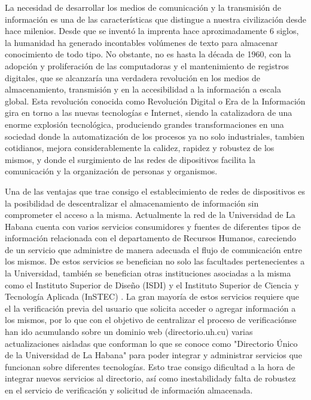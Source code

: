 \begin{introduction}
        La necesidad de desarrollar los medios de comunicación y la transmisión de información 
    es una de las características que distingue a nuestra civilización desde hace milenios. Desde 
    que se inventó la imprenta hace aproximadamente 6 siglos, la humanidad ha generado incontables 
    volúmenes de texto para almacenar conocimiento de todo tipo. No obstante, no es hasta la 
    década de 1960, con la adopción y proliferación de las computadoras y el mantenimiento de registros 
    digitales, que se alcanzaría una verdadera revolución en los medios de almacenamiento, transmisión 
    y en la accesibilidad a la información a escala global. Esta revolución conocida como Revolución 
    Digital o Era de la Información gira en torno a las nuevas tecnologías e Internet, siendo la 
    catalizadora de una enorme explosión tecnológica, produciendo grandes transformaciones en una 
    sociedad donde la automatización de los procesos ya no solo industriales, tambien cotidianos, 
    mejora considerablemente la calidez, rapidez y robustez de los mismos, y donde el surgimiento 
    de las redes de dipositivos facilita la comunicación y la organización de personas y organismos.
        
        Una de las ventajas que trae consigo el establecimiento de redes de dispositivos es la posibilidad 
    de descentralizar el almacenamiento de información sin comprometer el acceso a la misma. Actualmente 
    la red de la Universidad de La Habana cuenta con varios servicios consumidores y fuentes 
    de diferentes tipos de información relacionada con el  departamento de Recursos Humanos, careciendo 
    de un servicio que administre de manera adecuada el flujo de comunicación entre los mismos. De estos servicios 
    se benefician no solo las facultades pertenecientes a la Universidad, también se benefician otras 
    instituciones asociadas a la misma como el Instituto Superior de Diseño (ISDI) y el Instituto Superior 
    de Ciencia y Tecnología Aplicada (InSTEC) . La gran mayoría de estos servicios requiere que el la 
    verificación previa del usuario que solicita acceder o agregar información a los mismos, por lo que 
    con el objetivo de centralizar el proceso de verificaciónse han ido acumulando sobre un dominio web 
    (directorio.uh.cu) varias actualizaciones aisladas que conforman lo que se conoce como "Directorio 
    Único de la Universidad de La Habana" para poder integrar y administrar servicios que funcionan sobre 
    diferentes tecnologías. Esto trae consigo dificultad a la hora de integrar nuevos servicios al directorio, 
    así como inestabilidady falta de robustez en el servicio de verificación y solicitud de información almacenada.




\end{introduction}
